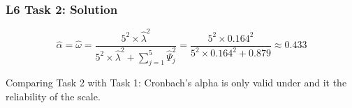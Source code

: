 \documentclass[compress]{beamer}\usepackage[]{graphicx}\usepackage[]{xcolor}
\begin{document}
\begin{frame}[fragile]
  \frametitle{L6 Task 2: Solution}
      \[ \hat{\alpha} = \hat{\omega} = \frac{ 5^2 \times \hat{\lambda}^2 }{ 5^2 \times \hat{\lambda}^2 + \sum_{j=1}^5 \hat{\Psi}_j^2 } = \frac{ 5^2 \times 0.164^2 }{ 5^2 \times 0.164^2 + 0.879 } \approx 0.433 \]

    Comparing Task 2 with Task 1: Cronbach's alpha is only valid under  and it  the reliability of the scale.
\end{frame}
\end{document}
